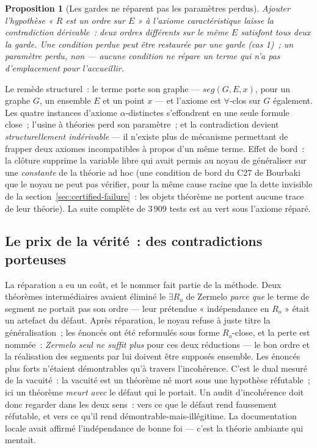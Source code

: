 \documentclass[11pt]{article}
\newtheorem{proposition}{Proposition}
\theoremstyle{remark}\newtheorem{example}{Exemple}
\begin{document}
\begin{proposition}[Les gardes ne réparent pas les paramètres perdus]
Ajouter l'hypothèse « $R$ est un ordre sur $E$ » à l'axiome caractéristique laisse la
contradiction dérivable~: deux ordres \emph{différents} sur le même $E$ satisfont tous
deux la garde. Une \emph{condition} perdue peut être restaurée par une garde (cas 1)~;
un \emph{paramètre} perdu, non --- aucune condition ne répare un terme qui n'a pas
d'emplacement pour l'accueillir.
\end{proposition}

Le remède structurel~: le terme porte son graphe --- $\mathit{seg}(G,E,x)$, pour un
graphe $G$, un ensemble $E$ et un point $x$ --- et l'axiome
est $\forall$-clos sur $G$ également. Les quatre instances d'axiome
$\alpha$-distinctes s'effondrent en une seule formule close~; l'usine à théories perd
son paramètre~; et la contradiction devient \emph{structurellement indérivable} --- il
n'existe plus de mécanisme permettant de frapper deux axiomes incompatibles à propos
d'un même terme. Effet de bord~: la clôture supprime la variable libre qui avait permis
au noyau de généraliser sur une \emph{constante} de la théorie ad hoc (une condition de
bord du C27 de Bourbaki que le noyau ne peut pas vérifier, pour la même cause racine
que la dette invisible de la section~\ref{sec:certified-failure}~: les objets théorème
ne portent aucune trace de leur théorie). La suite complète de 3\,909 tests est au vert
sous l'axiome réparé.

\subsection{Le prix de la vérité~: des contradictions porteuses}
La réparation a eu un coût, et le nommer fait partie de la méthode. Deux théorèmes
intermédiaires avaient éliminé le $\exists R_o$ de Zermelo \emph{parce que} le terme de
segment ne portait pas son ordre --- leur prétendue « indépendance en $R_o$ » était un
artefact du défaut. Après réparation, le noyau refuse à juste titre la
généralisation~; les énoncés ont été reformulés sous forme $R_o$-close, et la perte est
nommée~: \emph{Zermelo seul ne suffit plus} pour ces deux réductions --- le bon ordre
et la réalisation des segments par lui doivent être supposés ensemble. Les énoncés plus
forts n'étaient démontrables qu'à travers l'incohérence. C'est le dual mesuré de la
vacuité~: la vacuité est un théorème né mort sous une hypothèse réfutable~; ici un
théorème \emph{meurt avec} le défaut qui le portait. Un audit d'incohérence doit donc
regarder dans les deux sens~: vers ce que le défaut rend faussement réfutable, et vers
ce qu'il rend démontrable-mais-illégitime. La documentation locale avait affirmé
l'indépendance de bonne foi --- c'est la théorie ambiante qui mentait.
\end{document}
